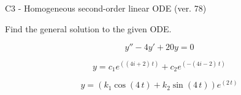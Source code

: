 \begin{exercise}
  \begin{exerciseTitle}C3 - Homogeneous second-order linear ODE (ver. 78)\end{exerciseTitle}
  \begin{exerciseStatement}
    
Find the general solution to the given ODE.

    
\[y''-4y'+20y = 0\]

  \end{exerciseStatement}
  \begin{exerciseAnswer}
    
\[y= c_{1} e^{\left(\left(4 i + 2\right) \, t\right)} + c_{2} e^{\left(-\left(4 i - 2\right) \, t\right)}\]

    
\[y= {\left(k_{1} \cos\left(4 \, t\right) + k_{2} \sin\left(4 \, t\right)\right)} e^{\left(2 \, t\right)}\]

  \end{exerciseAnswer}
\end{exercise}